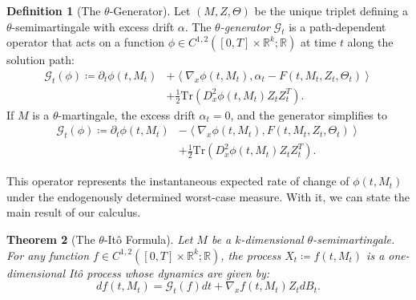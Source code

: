 \documentclass[12pt, letterpaper]{amsart}
\newcommand{\R}{\mathbb{R}}
\newcommand{\scpr}[2]{\left\langle #1, #2 \right\rangle}
\newcommand{\Tr}{\mathrm{Tr}}
\theoremstyle{plain}
\newtheorem{theorem}{Theorem}[section]
\theoremstyle{definition}
\newtheorem{definition}[theorem]{Definition}
\theoremstyle{remark}
\numberwithin{equation}{section} %
\begin{document}
\begin{definition}[The $\theta$-Generator]
\label{def:theta_generator}
Let \((M, Z, \Theta)\) be the unique triplet defining a \(\theta\)-semimartingale with excess drift $\alpha$. The \emph{\(\theta\)-generator} \(\mathcal{G}_t\) is a path-dependent operator that acts on a function \(\phi \in C^{1,2}([0,T] \times \R^k; \R)\) at time \(t\) along the solution path:
\begin{align*}
    \mathcal{G}_t(\phi) \coloneqq \partial_t \phi(t,M_t) &+ \scpr{\nabla_x \phi(t,M_t)}{\alpha_t - F(t, M_t, Z_t, \Theta_t)} \\
    &+ \frac{1}{2}\Tr\left(D^2_x \phi(t,M_t) Z_t Z_t^T \right).
\end{align*}
If $M$ is a \(\theta\)-martingale, the excess drift $\alpha_t=0$, and the generator simplifies to
\begin{align*}
    \mathcal{G}_t(\phi) \coloneqq \partial_t \phi(t,M_t) &- \scpr{\nabla_x \phi(t,M_t)}{F(t, M_t, Z_t, \Theta_t)} \\
    &+ \frac{1}{2}\Tr\left(D^2_x \phi(t,M_t) Z_t Z_t^T \right).
\end{align*}
\end{definition}

This operator represents the instantaneous expected rate of change of \(\phi(t, M_t)\) under the endogenously determined worst-case measure. With it, we can state the main result of our calculus.

\begin{theorem}[The $\theta$-Itô Formula]
\label{thm:theta_ito_formula}
Let \(M\) be a \(k\)-dimensional \(\theta\)-semimartingale. For any function \(f \in C^{1,2}([0,T] \times \R^k; \R)\), the process \(X_t \coloneqq f(t, M_t)\) is a one-dimensional Itô process whose dynamics are given by:
\begin{equation}
    df(t, M_t) = \mathcal{G}_t(f) dt + \nabla_x f(t,M_t) Z_t dB_t.
\end{equation}
\end{theorem}
\end{document}
